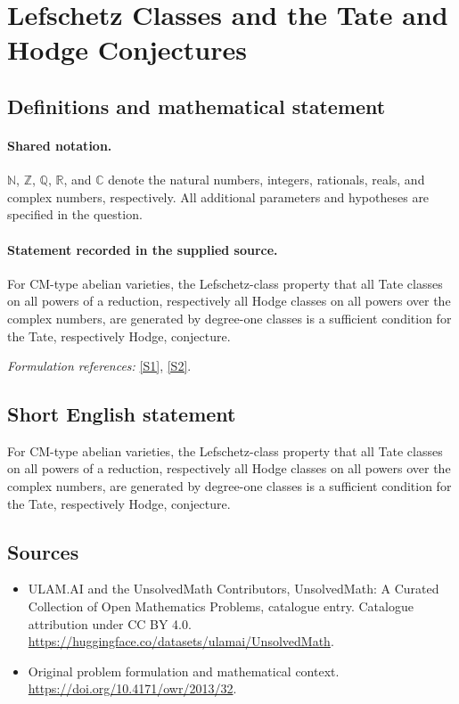 \documentclass[11pt]{article}
\newcommand{\sref}[2]{\hyperlink{source:#1:#2}{[S#2]}}
\begin{document}
\section{Lefschetz Classes and the Tate and Hodge Conjectures}\label{statement}

\subsection{Definitions and mathematical statement}

\paragraph{Shared notation.}$\mathbb N$, $\mathbb Z$, $\mathbb Q$, $\mathbb R$, and $\mathbb C$ denote the natural numbers, integers, rationals, reals, and complex numbers, respectively. All additional parameters and hypotheses are specified in the question.


\paragraph{Statement recorded in the supplied source.}
For CM-type abelian varieties, the Lefschetz-class property that all Tate classes on all powers of a reduction, respectively all Hodge classes on all powers over the complex numbers, are generated by degree-one classes is a sufficient condition for the Tate, respectively Hodge, conjecture.
\par\smallskip\textit{Formulation references:} \sref{statement}{1}, \sref{statement}{2}.
\subsection{Short English statement}
For CM-type abelian varieties, the Lefschetz-class property that all Tate classes on all powers of a reduction, respectively all Hodge classes on all powers over the complex numbers, are generated by degree-one classes is a sufficient condition for the Tate, respectively Hodge, conjecture.
\subsection{Sources}
\begin{itemize}
\item[\hypertarget{source:statement:1}{S1}] ULAM.AI and the UnsolvedMath Contributors, UnsolvedMath: A Curated Collection of Open Mathematics Problems, catalogue entry. Catalogue attribution under CC BY 4.0.
\url{https://huggingface.co/datasets/ulamai/UnsolvedMath}.
\item[\hypertarget{source:statement:2}{S2}] Original problem formulation and mathematical context.
\url{https://doi.org/10.4171/owr/2013/32}.
\end{itemize}
\label{end:statement}
\end{document}
